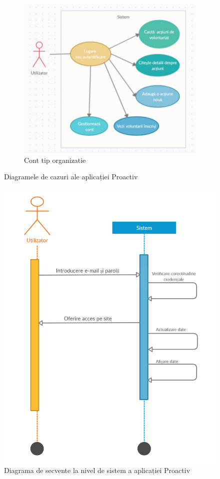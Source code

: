 \documentclass[12pt,a4paper]{report}
\begin{document}
\begin{figure}[h!]
\begin{subfigure}[b]{0.42\linewidth}
    \includegraphics[width=\linewidth]{./imagini/UC_Organizatie.JPG}
    \caption{Cont tip organizatie}
  \end{subfigure}
  \caption{Diagramele de cazuri ale aplicației Proactiv}
\end{figure}

\begin{figure}[h]
\centering
  \includegraphics[width=0.5\linewidth]{./imagini/Sequence.jpg}
  \caption{Diagrama de secvente la nivel de sistem a aplicației Proactiv}
\end{figure}


\newpage
\end{document}
